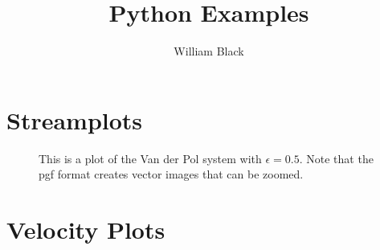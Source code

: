 \documentclass[letterpaper, 12pt, reqno]{amsart}
\title{Python Examples}
\author{William Black}
\date{}
\begin{document}
\maketitle

\section{Streamplots}
\begin{figure}[h]
  \begin{center}
    
    \caption{This is a plot of the Van der Pol system with \(\epsilon = 0.5\). Note that the pgf format creates vector images that can be zoomed.}
  \end{center}
\end{figure}
\newpage


\newpage
\section{Velocity Plots}

\begin{figure}[h]
  \begin{center}
    
  \end{center}
\end{figure}
\newpage

\end{document}
